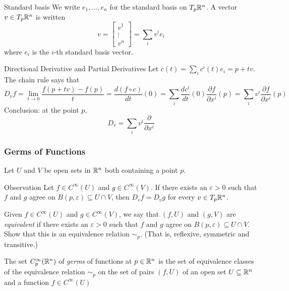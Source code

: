 \begin{frame}
  \begin{block}
    {Standard basis}
    We write $e_1, \dots, e_n$ for the standard basis on $T_p \mathbb R^n$. A
    vector $v \in T_p\mathbb R^n$ is written
    \begin{displaymath}
      v = 
      \begin{bmatrix}
        v^1 \\
        \vdots \\
        v^n
      \end{bmatrix}
      = \sum_i v^i e_i
    \end{displaymath}
    where $e_i$ is the $i$-th standard basis vector.
  \end{block}
  \begin{block}
    {Directional Derivative and Partial Derivatives}
    Let $c(t) = \sum_i c^i(t) e_i= p + tv $. The chain rule says that
    \begin{displaymath}
      D_vf = \lim_{t \to 0} \frac{f(p + tv) - f(p)}{t} = \frac{d(f \circ c)}{dt}(0) =
      \sum_i \frac{dc^i}{dt}(0) \frac{\partial f}{\partial x^i}(p)
      = \sum_i v^i \frac{\partial f}{\partial x^i}(p)
    \end{displaymath}
    Conclusion: at the point $p$,
    \begin{displaymath}
      D_v
      = \sum_i v^i \frac{\partial }{\partial x^i}
    \end{displaymath}
  \end{block}
\end{frame}
\begin{frame}
  \frametitle{Germs of Functions}
  Let $U$ and $V$ be open sets in $\mathbb R^n$ both containing a point $p$.
  \begin{block}
    {Observation}
    Let $f \in C^{\infty}(U)$ and $g \in C^{\infty}(V)$.
    If
    there exists an $\varepsilon > 0$
    such that $f$ and $g$ agree on $B(p, \varepsilon) \subseteq U \cap V$, then 
    $D_v f = D_v g$ for every $v \in T_p\mathbb R^n$.
  \end{block}
  \begin{definition}
    Given $f \in C^{\infty}(U)$ and $g \in C^{\infty}(V)$, we say that $(f, U)$ and
    $(g, V)$ are {\em equivalent} if there exists an $\varepsilon > 0$ such that $f$
    and $g$ agree on $B(p, \varepsilon) \subseteq U \cap V$. Show that this is
    an equivalence relation $\sim_p$. (That is, reflexive, symmetric and transitive.)
  \end{definition}
  \begin{definition}[Germs]
    The set $C^{\infty}_p(\mathbb R^n)$ of {\em germs} of functions at $p \in \mathbb R^n$ is
    the set of equivalence classes of the equivalence relation $\sim_p$ on
    the set of pairs $(f, U)$ of an open set $U \subseteq \mathbb R^n$ and a function
    $f \in C^{\infty}(U)$
  \end{definition}
\end{frame}
